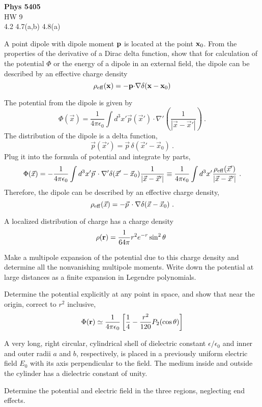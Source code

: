 \documentclass[12pt]{article}
\newcommand{\x}{{\bf x}}
\newcommand{\p}{{\bf p}}
\begin{document}
\begin{center}
{\bf Phys 5405}\\
HW 9 \\
4.2 4.7(a,b) 4.8(a)
\end{center}
 A point dipole with dipole moment $\bf p$ is located at the point ${\bf x}_0$. From the properties of the derivative of a Dirac delta function, show that for calculation of the potential $\Phi$ or the energy of a dipole in an external field, the dipole can be described by an effective charge density
$$
\rho_{\rm eff}(\x) = - \p {\bf \cdot \nabla} \delta(\x - \x_0)
$$

\newpage
{}
The potential from the dipole is given by
\begin{equation}
    \Phi(\vec x) = \frac{1}{4\pi \epsilon_0} \int d^3 x' \vec p(\vec x') \cdot \nabla'\left(\frac{1}{|\vec x - \vec x'|}\right)~.
\end{equation}
The distribution of the dipole is a delta function,
\begin{equation}
    \vec p(\vec x') = \vec p \, \delta(\vec x' - \vec x_0)~.
\end{equation}
Plug it into the formula of potential and integrate by parts,
\begin{equation}
    \Phi(\vec x) = -\frac{1}{4\pi \epsilon_0} \int d^3 x' \vec p \,\cdot \nabla' \delta(\vec x' - \vec x_0) \frac{1}{|\vec x - \vec x'|} \equiv \frac{1}{4\pi \epsilon_0} \int d^3x' \frac{\rho_{\rm eff}(\vec x')}{|\vec x - \vec x'|}~.
\end{equation}
Therefore, the dipole can be described by an effective charge density,
\begin{equation}
    \rho_{\rm eff}(\vec x) = - \vec p\, \cdot \nabla \delta(\vec x - \vec x_0)~.
\end{equation}

\newpage
{} A localized distribution of charge has a charge density
$$
\rho({\bf r}) = \frac{1}{64 \pi} r^2 e^{-r} \sin^2\theta~
$$

 Make a multipole expansion of the potential due to this charge density and determine all the nonvanishing multipole moments. Write down the potential at large distances as a finite expansion in Legendre polynomials.

 Determine the potential explicitly at any point in space, and show that near the origin, correct to $r^2$ inclusive,
$$
\Phi({\bf r}) \simeq \frac{1}{4\pi \epsilon_0} \left[\frac{1}{4} - \frac{r^2}{120} P_2(\cos\theta)\right]
$$

\newpage
{} A very long, right circular, cylindrical shell of dielectric constant $\epsilon/\epsilon_0$ and inner and outer radii $a$ and $b$, respectively, is placed in a previously uniform electric field $E_0$ with its axis perpendicular to the field. The medium inside and outside the cylinder has a dielectric constant of unity.

 Determine the potential and electric field in the three regions, neglecting end effects.
\end{document}

